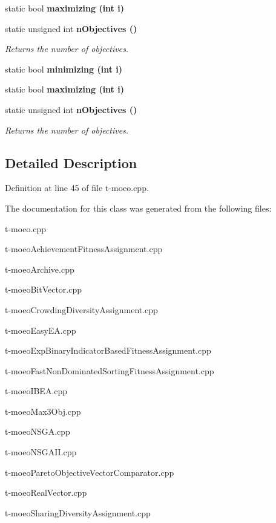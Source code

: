 \begin{CompactItemize}
\item 
static bool \bf{maximizing} (int i)\label{classObjectiveVectorTraits_69ddc04a4bf7b842f5457f7cff09c479}

\item 
static unsigned int \bf{n\-Objectives} ()\label{classObjectiveVectorTraits_8f8cb44cfe76117ab1c5624e4fced91f}

\begin{CompactList}\small\item\em Returns the number of objectives. \item\end{CompactList}\item 
static bool \bf{minimizing} (int i)\label{classObjectiveVectorTraits_52dc1c3dd95f37fe256708f40189a6fd}

\item 
static bool \bf{maximizing} (int i)\label{classObjectiveVectorTraits_69ddc04a4bf7b842f5457f7cff09c479}

\item 
static unsigned int \bf{n\-Objectives} ()\label{classObjectiveVectorTraits_8f8cb44cfe76117ab1c5624e4fced91f}

\begin{CompactList}\small\item\em Returns the number of objectives. \item\end{CompactList}\end{CompactItemize}


\subsection{Detailed Description}




Definition at line 45 of file t-moeo.cpp.

The documentation for this class was generated from the following files:\begin{CompactItemize}
\item 
t-moeo.cpp\item 
t-moeo\-Achievement\-Fitness\-Assignment.cpp\item 
t-moeo\-Archive.cpp\item 
t-moeo\-Bit\-Vector.cpp\item 
t-moeo\-Crowding\-Diversity\-Assignment.cpp\item 
t-moeo\-Easy\-EA.cpp\item 
t-moeo\-Exp\-Binary\-Indicator\-Based\-Fitness\-Assignment.cpp\item 
t-moeo\-Fast\-Non\-Dominated\-Sorting\-Fitness\-Assignment.cpp\item 
t-moeo\-IBEA.cpp\item 
t-moeo\-Max3Obj.cpp\item 
t-moeo\-NSGA.cpp\item 
t-moeo\-NSGAII.cpp\item 
t-moeo\-Pareto\-Objective\-Vector\-Comparator.cpp\item 
t-moeo\-Real\-Vector.cpp\item 
t-moeo\-Sharing\-Diversity\-Assignment.cpp\end{CompactItemize}
